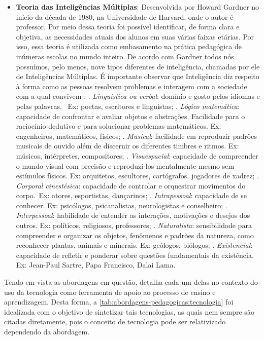 \begin{itemize}
    \item \textbf{Teoria das Inteligências Múltiplas}: Desenvolvida por Howard Gardner no início da década de 1980, na Universidade de Harvard, onde o autor é professor. Por meio dessa teoria foi possível identificar, de forma clara e objetiva, as necessidades atuais dos alunos em suas várias faixas etárias. Por isso, essa teoria é utilizada como embasamento na prática pedagógica de inúmeras escolas no mundo inteiro. De acordo com Gardner todos nós possuímos, pelo menos, nove tipos diferentes de inteligência, chamadas por ele de Inteligências Múltiplas. É importante observar que Inteligência diz respeito à forma como as pessoas resolvem problemas e interagem com a sociedade com a qual convivem \cite{Gardner1995}:
    . \textit{Linguística ou verbal}: domínio e gosto pelos idiomas e pelas palavras.  Ex: poetas, escritores e linguistas;
    . \textit{Lógico matemática}:  capacidade de confrontar e avaliar objetos e abstrações. Facilidade para o raciocínio dedutivo e para solucionar problemas matemáticos. Ex: engenheiros, matemáticos, físicos;
    . \textit{Musical}: facilidade em reproduzir padrões musicais de ouvido além de discernir os diferentes timbres e ritmos. Ex: músicos, intérpretes, compositores;
    . \textit{Visuespacial}: capacidade de compreender o mundo visual com precisão e reproduzi-los mentalmente mesmo sem estímulos físicos. Ex: arquitetos, escultores, cartógrafos, jogadores de xadrez;
    . \textit{Corporal cinestésica}: capacidade de controlar e orquestrar movimentos do corpo. Ex: atores, esportistas, dançarinos;
    . \textit{Intrapessoal}: capacidade de se conhecer. Ex: psicólogos, psicanalistas, neurologistas e conselheiro;
    . \textit{Interpessoal}: habilidade de entender as interações, motivações e desejos dos outros. Ex: políticos, religiosos, professores;
    . \textit{Naturalista}: sensibilidade para compreender e organizar os objetos, fenômenos e padrões da natureza, como reconhecer plantas, animais e minerais. Ex: geólogos, biólogos;
    . \textit{Existencial}: capacidade de refletir e ponderar sobre questões fundamentais da existência. Ex: Jean-Paul Sartre, Papa Francisco, Dalai Lama. 
\end{itemize}

Tendo em vista as abordagens em questão,  detalha cada um delas no contexto do uso da tecnologia como ferramenta de apoio ao processo de ensino e aprendizagem. Desta forma, a \autoref{tab:abordagens-pedagogicas:tecnologia} foi idealizada com o objetivo de sintetizar tais tecnologias, as quais nem sempre são citadas diretamente, pois o conceito de tecnologia pode ser relativizado dependendo da abordagem.

